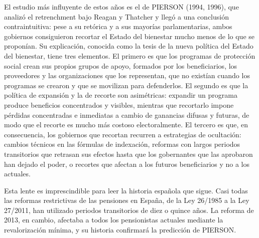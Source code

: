 \documentclass[10pt,a4paper]{article}
\begin{document}
El estudio más influyente de estos años es el de PIERSON (1994, 1996), que analizó el retrenchment bajo Reagan y Thatcher y llegó a una conclusión contraintuitiva: pese a su retórica y a sus mayorías parlamentarias, ambos gobiernos consiguieron recortar el Estado del bienestar mucho menos de lo que se proponían. Su explicación, conocida como la tesis de la nueva política del Estado del bienestar, tiene tres elementos. El primero es que los programas de protección social crean sus propios grupos de apoyo, formados por los beneficiarios, los proveedores y las organizaciones que los representan, que no existían cuando los programas se crearon y que se movilizan para defenderlos. El segundo es que la política de expansión y la de recorte son asimétricas: expandir un programa produce beneficios concentrados y visibles, mientras que recortarlo impone pérdidas concentradas e inmediatas a cambio de ganancias difusas y futuras, de modo que el recorte es mucho más costoso electoralmente. El tercero es que, en consecuencia, los gobiernos que recortan recurren a estrategias de ocultación: cambios técnicos en las fórmulas de indexación, reformas con largos periodos transitorios que retrasan sus efectos hasta que los gobernantes que las aprobaron han dejado el poder, o recortes que afectan a los futuros beneficiarios y no a los actuales.

Esta lente es imprescindible para leer la historia española que sigue. Casi todas las reformas restrictivas de las pensiones en España, de la Ley 26/1985 a la Ley 27/2011, han utilizado periodos transitorios de diez o quince años. La reforma de 2013, en cambio, afectaba a todos los pensionistas actuales mediante la revalorización mínima, y su historia confirmará la predicción de PIERSON.
\end{document}
